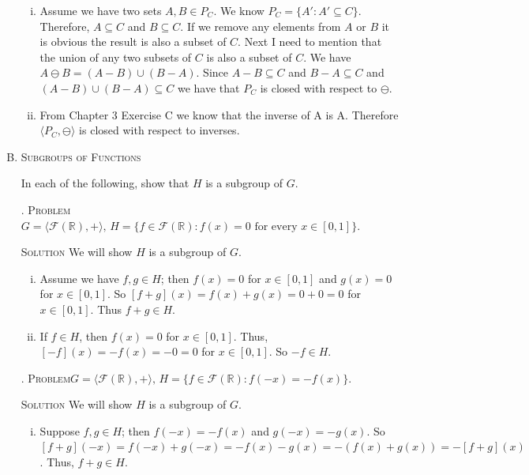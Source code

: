 \documentclass[twoside]{amsart}
\newcommand{\solution}{\textsc{Solution}\xspace}
\newcommand{\problem}{\textsc{Problem}\xspace}
\begin{document}
\begin{enumerate}[A.]
   \begin{enumerate}[(i)]
      \item Assume we have two sets $A,B \in P_C$. We know $P_C = \{ A' : A'
      \subseteq C\}$. Therefore, $A \subseteq C$ and $B \subseteq C$. If we
      remove any elements from $A$ or $B$ it is obvious the result is also a
      subset of $C$. Next I need to mention that the union of any two subsets
      of $C$ is also a subset of $C$.  We have $A \ominus B = (A - B) \cup (B -
      A)$. Since $A-B\subseteq C$ and $B-A\subseteq C$ and $(A-B)\cup (B-A)
      \subseteq C$ we have that $P_C$ is closed with respect to $\ominus$.


      \item From Chapter 3 Exercise C we know that the inverse of A is A. 
      Therefore $\langle P_C, \ominus \rangle$ is closed with respect
      to inverses. 
   \end{enumerate} 

   \item \textsc{Subgroups of Functions}

   \noindent In each of the following, show that $H$ is a subgroup of $G$.

   . \problem $G = \langle \mathcal{F}(\mathbb{R}), + \rangle,\, H=
   \{ f \in \mathcal{F}(\mathbb{R}) : f(x) = 0 \text{ for every } 
   x \in [0,1]\}$.

   \noindent \solution We will show $H$ is a subgroup of $G$.
   
   \begin{enumerate}[(i)]
      \item Assume we have $f,g \in H$; then $f(x) = 0$ for $x \in [0,1]$ and
      $g(x) = 0$ for $x \in [0,1]$. So $[f+g](x) = f(x) + g(x) = 0 + 0 = 0$ for
      $x \in [0,1]$. Thus $f+g \in H$.

      \item If $f \in H$, then $f(x) = 0$ for $x \in [0,1]$. Thus,
      $[-f](x)=-f(x)=-0=0$ for $x \in [0,1]$. So $-f \in H$.

   \end{enumerate}

   . \problem $G = \langle \mathcal{F}(\mathbb{R}), + \rangle,\, H =
   \{ f \in \mathcal{F}(\mathbb{R}) : f(-x) = -f(x)\}$.

   \noindent \solution We will show $H$ is a subgroup of $G$.

   \begin{enumerate}[(i)]
      \item Suppose $f,g\in H$; then $f(-x) = -f(x)$ and $g(-x) = -g(x)$.
      So $[f+g](-x) = f(-x) + g(-x) = -f(x) - g(x) = -(f(x) + g(x)) = 
      - [f+g](x)$. Thus, $f+g\in H$.


\end{enumerate}
\end{enumerate}
\end{document}
